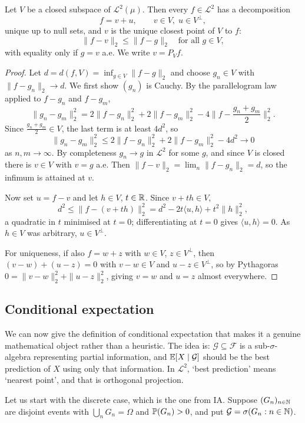 \documentclass[a4paper]{scrartcl}
\newcommand{\cF}{\mathcal{F}}
\newcommand{\cG}{\mathcal{G}}
\newcommand{\cL}{\mathcal{L}}
\newcommand{\ip}[2]{\langle #1, #2 \rangle}
\begin{document}
\begin{theorem}\label{thm:projection}
	Let $V$ be a closed subspace of $\cL^2(\mu)$. Then every $f \in \cL^2$ has a decomposition
	$$
	f = v + u, \qquad v \in V, \; u \in V^\perp,
	$$
	unique up to null sets, and $v$ is the unique closest point of $V$ to $f$:
	$$
	\|f - v\|_2 \leq \|f-g\|_2 \quad \text{for all } g \in V,
	$$
	with equality only if $g = v$ a.e. We write $v = P_V f$.
\end{theorem}
\begin{proof}
	Let $d = d(f,V) = \inf_{g \in V}\|f-g\|_2$ and choose $g_n \in V$ with $\|f - g_n\|_2 \to d$. We first show $(g_n)$ is Cauchy. By the parallelogram law applied to $f - g_n$ and $f-g_m$,
	$$
	\|g_n - g_m\|_2^2 = 2\|f-g_n\|_2^2 + 2\|f-g_m\|_2^2 - 4\Big\| f - \frac{g_n+g_m}{2}\Big\|_2^2.
	$$
	Since $\frac{g_n+g_m}{2}\in V$, the last term is at least $4d^2$, so
	$$
	\|g_n-g_m\|_2^2 \leq 2\|f-g_n\|_2^2+2\|f-g_m\|_2^2 - 4d^2 \longrightarrow 0
	$$
	as $n,m\to\infty$. By completeness $g_n \to g$ in $\cL^2$ for some $g$, and since $V$ is closed there is $v \in V$ with $v = g$ a.e. Then $\|f-v\|_2 = \lim_n\|f-g_n\|_2 = d$, so the infimum is attained at $v$.

	Now set $u = f - v$ and let $h \in V$, $t\in\mathbb{R}$. Since $v + th\in V$,
	$$
	d^2 \leq \|f - (v+th)\|_2^2 = d^2 - 2t\ip{u}{h}+t^2\|h\|_2^2,
	$$
	a quadratic in $t$ minimised at $t=0$; differentiating at $t=0$ gives $\ip{u}{h}=0$. As $h \in V$ was arbitrary, $u \in V^\perp$.

	For uniqueness, if also $f = w+z$ with $w\in V$, $z\in V^\perp$, then $(v-w)+(u-z)=0$ with $v - w \in V$ and $u-z\in V^\perp$, so by Pythagoras $0 = \|v-w\|_2^2+\|u-z\|_2^2$, giving $v=w$ and $u=z$ almost everywhere.
\end{proof}

\subsection{Conditional expectation}

We can now give the definition of conditional expectation that makes it a genuine mathematical object rather than a heuristic. The idea is: $\cG \subseteq \cF$ is a sub-$\sigma$-algebra representing partial information, and $\EE[X\mid\cG]$ should be the best prediction of $X$ using only that information. In $\cL^2$, `best prediction' means `nearest point', and that is orthogonal projection.

Let us start with the discrete case, which is the one from IA. Suppose $(G_n)_{n\in\mathbb{N}}$ are disjoint events with $\bigcup_n G_n = \Omega$ and $\mathbb{P}(G_n) > 0$, and put $\cG = \sigma(G_n : n \in \N)$.
\end{document}
